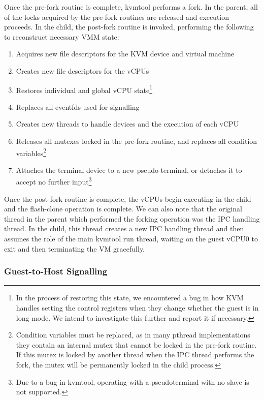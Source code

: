 Once the pre-fork routine is complete, kvmtool performs a fork. In the
parent, all of the locks acquired by the pre-fork routines are released and
execution proceeds. In the child, the post-fork routine is invoked, performing
the following to reconstruct necessary VMM state:

\begin{enumerate}
\item Acquires new file descriptors for the KVM device and virtual machine
\item Creates new file descriptors for the vCPUs
\item Restores individual and global vCPU state\footnote{In the process of
restoring this state, we encountered a bug in how KVM handles setting the
control registers when they change whether the guest is in long mode. We intend
to investigate this further and report it if necessary.}
\item Replaces all eventfds used for signalling
\item Creates new threads to handle devices and the execution of each vCPU
\item Releases all mutexes locked in the pre-fork routine, and replaces all
condition variables\footnote{Condition variables must be replaced, as in many
pthread implementations they contain an internal mutex that cannot be locked in
the pre-fork routine. If this mutex is locked by another thread when the IPC
thread performs the fork, the mutex will be permanently locked in the child
process.}
\item Attaches the terminal device to a new pseudo-terminal, or detaches it to
accept no further input\footnote{Due to a bug in kvmtool, operating with a
pseudoterminal with no slave is not supported.}
\end{enumerate}

Once the post-fork routine is complete, the vCPUs begin executing in the child
and the flash-clone operation is complete. We can also note that the original
thread in the parent which performed the forking operation was the IPC handling
thread. In the child, this thread creates a new IPC handling thread and then
assumes the role of the main kvmtool run thread, waiting on the guest vCPU0 to
exit and then terminating the VM gracefully.

\subsubsection{Guest-to-Host Signalling}

